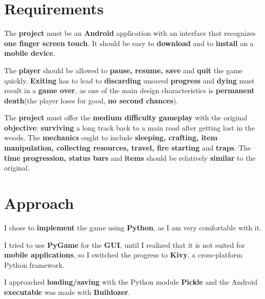 	\section*{Requirements}
		\par The \textbf{project} must be an \textbf{Android} application with an interface that recognizes \textbf{one finger screen touch}. It should be easy to \textbf{download} and to \textbf{install} on a \textbf{mobile device}. 
		\par The \textbf{player} should be allowed to \textbf{pause, resume, save} and \textbf{quit} the game quickly. \textbf{Exiting} has to lead to \textbf{discarding} unsaved \textbf{progress} and \textbf{dying} must result in a \textbf{game over}, as one of the main design characteristics is \textbf{permanent death}(the player loses for good, \textbf{no second chances}). 
		\par The \textbf{project} must offer the \textbf{medium difficulty gameplay} with the original \textbf{objective}: \textbf{surviving} a long track back to a main road after getting lost in the woods. The \textbf{mechanics} ought to include \textbf{sleeping, crafting, item manipulation, collecting resources, travel, fire starting} and \textbf{traps}. The \textbf{time progression, status bars} and \textbf{items} should be relatively \textbf{similar} to the original.

	\section*{Approach}
		\par I chose to \textbf{implement} the game using \textbf{Python}, as I am very comfortable with it. 
		\par I tried to use \textbf{PyGame}\cite{Pygame} for the \textbf{GUI}, until I realized that it is not suited for \textbf{mobile applications}, so I switched the progress to \textbf{Kivy}\cite{Kivy}, a cross-platform Python framework.
		\par I approached \textbf{loading/saving} with the Python module \textbf{Pickle}\cite{Pickle} and the Android \textbf{executable} was made with \textbf{Buildozer}\cite{Buildozer}. 

